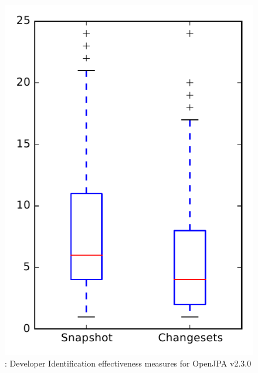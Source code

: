 
\begin{figure}
\centering
\includegraphics[height=0.4\textheight]{figures/dit/rq1_openjpa}
\caption{\done: Developer Identification effectiveness measures for OpenJPA v2.3.0}
\label{fig:dit:rq1:openjpa}
\end{figure}
